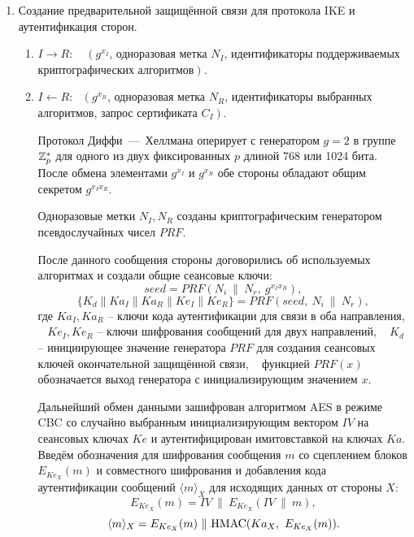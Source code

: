 \begin{enumerate}
    \item Создание предварительной защищённой связи для протокола IKE и аутентификация сторон.
        \begin{enumerate}
            \item $I \rightarrow R$: ~ $\left(g^{x_I}\right.$, одноразовая метка $N_I$, идентификаторы поддерживаемых криптографических алгоритмов$\left.\right)$.

            \item $I \leftarrow R$: ~$\left(g^{x_R}\right.$, одноразовая метка $N_R$, идентификаторы выбранных алгоритмов, запрос сертификата $C_I\left.\right)$.

                Протокол Диффи~---~Хеллмана оперирует с генератором $g=2$ в группе $\mathbb{Z}_p^*$ для одного из двух фиксированных $p$ длиной 768 или 1024 бита. После обмена элементами $g^{x_I}$ и $g^{x_R}$ обе стороны обладают общим секретом $g^{x_I x_R}$.

                Одноразовые метки $N_I, N_R$ созданы криптографическим генератором псевдослучайных чисел $PRF$.

                После данного сообщения стороны договорились об используемых алгоритмах и создали общие сеансовые ключи:
                    \[ seed = PRF(N_i ~\|~ N_r, ~g^{x_I x_R}), \]
                    \[ \{ K_d \| Ka_I \| Ka_R \| Ke_I \| Ke_R
                        \} = PRF(seed, ~ N_i ~\|~ N_r), \]
                где $Ka_I, Ka_R$ -- ключи кода аутентификации для связи в оба направления, ~ $Ke_I, Ke_R$ -- ключи шифрования сообщений для двух направлений, ~ $K_d$ -- инициирующее значение генератора $PRF$ для создания сеансовых ключей окончательной защищённой связи, ~ функцией $PRF(x)$ обозначается выход генератора с инициализирующим значением $x$.

                Дальнейший обмен данными зашифрован алгоритмом AES в режиме CBC со случайно выбранным инициализирующим вектором $IV$ на сеансовых ключах $Ke$ и аутентифицирован имитовставкой на ключах $Ka$. Введём обозначения для шифрования сообщения $m$ со сцеплением блоков $E_{Ke_X}(m)$ и совместного шифрования и добавления кода аутентификации сообщений $\langle m \rangle_X$ для исходящих данных от стороны $X$:
                    \[  E_{Ke_X}(m) = IV ~\|~ E_{Ke_X}(IV ~\|~ m), \]
                    \[  \langle m \rangle_X = E_{Ke_X}(m) ~\|~ \textrm{HMAC}(Ka_X, ~ E_{Ke_X}(m)). \]


\end{enumerate}
\end{enumerate}
